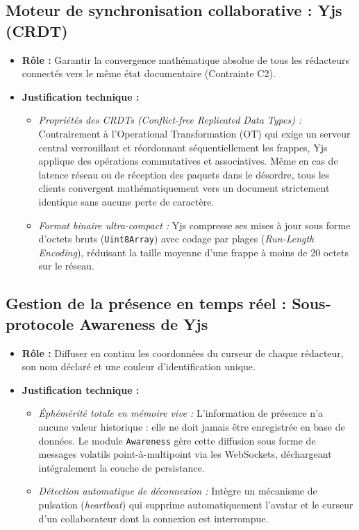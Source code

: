 \subsection{Moteur de synchronisation collaborative : Yjs (CRDT)}
\begin{itemize}
    \item \textbf{Rôle :} Garantir la convergence mathématique absolue de tous les rédacteurs connectés vers le même état documentaire (Contrainte C2).
    \item \textbf{Justification technique :} 
    \begin{itemize}
        \item \emph{Propriétés des CRDTs (Conflict-free Replicated Data Types) :} Contrairement à l'Operational Transformation (OT) qui exige un serveur central verrouillant et réordonnant séquentiellement les frappes, Yjs applique des opérations commutatives et associatives. Même en cas de latence réseau ou de réception des paquets dans le désordre, tous les clients convergent mathématiquement vers un document strictement identique sans aucune perte de caractère.
        \item \emph{Format binaire ultra-compact :} Yjs compresse ses mises à jour sous forme d'octets bruts (\texttt{Uint8Array}) avec codage par plages (\emph{Run-Length Encoding}), réduisant la taille moyenne d'une frappe à moins de 20 octets sur le réseau.
    \end{itemize}
\end{itemize}

\subsection{Gestion de la présence en temps réel : Sous-protocole Awareness de Yjs}
\begin{itemize}
    \item \textbf{Rôle :} Diffuser en continu les coordonnées du curseur de chaque rédacteur, son nom déclaré et une couleur d'identification unique.
    \item \textbf{Justification technique :} 
    \begin{itemize}
        \item \emph{Éphémérité totale en mémoire vive :} L'information de présence n'a aucune valeur historique : elle ne doit jamais être enregistrée en base de données. Le module \texttt{Awareness} gère cette diffusion sous forme de messages volatils point-à-multipoint via les WebSockets, déchargeant intégralement la couche de persistance.
        \item \emph{Détection automatique de déconnexion :} Intègre un mécanisme de pulsation (\emph{heartbeat}) qui supprime automatiquement l'avatar et le curseur d'un collaborateur dont la connexion est interrompue.
    \end{itemize}
\end{itemize}

